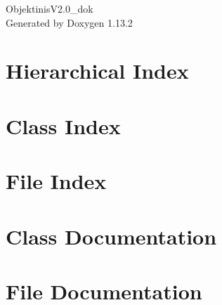 \documentclass[twoside]{book}
\newcommand{\+}{\discretionary{\mbox{\scriptsize$\hookleftarrow$}}{}{}}
\newcommand{\clearemptydoublepage}{%
    \newpage{\pagestyle{empty}\cleardoublepage}%
  }
\begin{document}
  \raggedbottom
    \hypersetup{pageanchor=false,
                bookmarksnumbered=true,
                pdfencoding=unicode
               }
  \begin{titlepage}
  \vspace*{7cm}
  \begin{center}%
  {\Large Objektinis\+V2.\+0\+\_\+dok}\\
  \vspace*{1cm}
  {\large Generated by Doxygen 1.13.2}\\
  \end{center}
  \end{titlepage}
  \clearemptydoublepage
  \tableofcontents
  \clearemptydoublepage
  \hypersetup{pageanchor=true}

\chapter{Hierarchical Index}

\chapter{Class Index}

\chapter{File Index}

\chapter{Class Documentation}


\chapter{File Documentation}


  \backmatter
  \newpage
  \clearemptydoublepage
  \printindex
\end{document}
